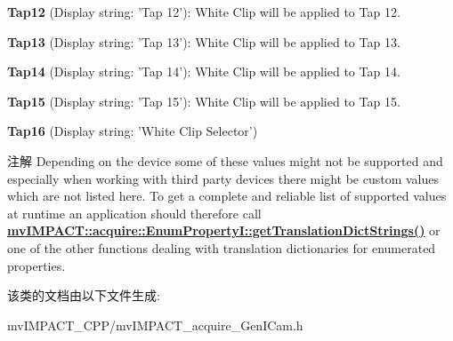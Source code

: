 \begin{DoxyItemize}
\item {\bfseries Tap12} (Display string\+: 'Tap 12')\+: White Clip will be applied to Tap 12.
\item {\bfseries Tap13} (Display string\+: 'Tap 13')\+: White Clip will be applied to Tap 13.
\item {\bfseries Tap14} (Display string\+: 'Tap 14')\+: White Clip will be applied to Tap 14.
\item {\bfseries Tap15} (Display string\+: 'Tap 15')\+: White Clip will be applied to Tap 15.
\item {\bfseries Tap16} (Display string\+: 'White Clip Selector')
\end{DoxyItemize}

\begin{DoxyNote}{注解}
Depending on the device some of these values might not be supported and especially when working with third party devices there might be custom values which are not listed here. To get a complete and reliable list of supported values at runtime an application should therefore call {\bfseries \hyperlink{classmv_i_m_p_a_c_t_1_1acquire_1_1_enum_property_i_a0ba6ccbf5ee69784d5d0b537924d26b6}{mv\+I\+M\+P\+A\+C\+T\+::acquire\+::\+Enum\+Property\+I\+::get\+Translation\+Dict\+Strings()}} or one of the other functions dealing with translation dictionaries for enumerated properties. 
\end{DoxyNote}


该类的文档由以下文件生成\+:\begin{DoxyCompactItemize}
\item 
mv\+I\+M\+P\+A\+C\+T\+\_\+\+C\+P\+P/mv\+I\+M\+P\+A\+C\+T\+\_\+acquire\+\_\+\+Gen\+I\+Cam.\+h\end{DoxyCompactItemize}
